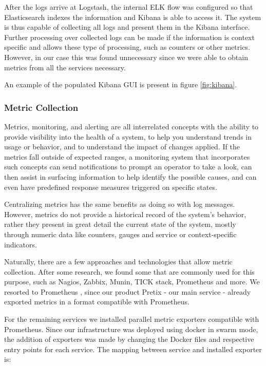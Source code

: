 \documentclass[12pt]{article}
\begin{document}
After the logs arrive at Logstash, the internal ELK flow was configured so that Elasticsearch indexes the information and Kibana is able to access it.
The system is thus capable of collecting all logs and present them in the Kibana interface.
Further processing over collected logs can be made if the information is context specific and allows these type of processing, such as counters or other metrics.
However, in our case this was found unnecessary since we were able to obtain metrics from all the services necessary.

An example of the populated Kibana GUI is present in figure \ref{fig:kibana}.

\subsubsection{Metric Collection}

Metrics, monitoring, and alerting are all interrelated concepts with the ability to provide visibility into the health of a system, to help you understand trends
in usage or behavior, and to understand the impact of changes applied.
If the metrics fall outside of expected ranges, a monitoring system that incorporates such concepts can send notifications to prompt an operator to take a look,
can then assist in surfacing information to help identify the possible causes, and can even have predefined response measures triggered on specific states.

Centralizing metrics has the same benefits as doing so with log messages.
However, metrics do not provide a historical record of the system's behavior, rather they present in great detail the current state of the system, mostly through
numeric data like counters, gauges and service or context-specific indicators.

Naturally, there are a few approaches and technologies that allow metric collection.
After some research, we found some that are commonly used for this purpose, such as Nagios, Zabbix, Munin, TICK stack, Prometheus and more.
We resorted to Prometheus \cite{prometheus}, since our product Pretix - our main service - already exported metrics in a format compatible with Prometheus.

For the remaining services we installed parallel metric exporters compatible with Prometheus.
Since our infrastructure was deployed using docker in swarm mode, the addition of exporters was made by changing the Docker files and respective entry points
for each service.
The mapping between service and installed exporter is:
\end{document}
